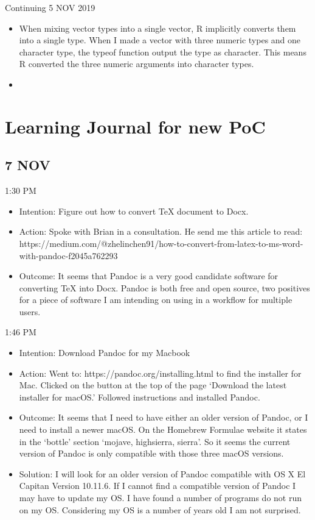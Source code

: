 \documentclass{article}
\begin{document}
Continuing 5 NOV 2019

\begin{itemize}
    \item When mixing vector types into a single vector, R implicitly converts them into a single type. When I made a vector with three numeric types and one character type, the typeof function output the type as character. This means R converted the three numeric arguments into character types.
    \item 
\end{itemize}

\section{Learning Journal for new PoC}

\subsection{7 NOV}

1:30 PM
\begin{itemize}
    \item Intention: Figure out how to convert TeX document to Docx.
    \item Action: Spoke with Brian in a consultation. He send me this article to read: https://medium.com/@zhelin\-chen91/how-to-convert-from-latex-to-ms-word-with-pandoc-f2045a762293
    \item Outcome: It seems that Pandoc is a very good candidate software for converting TeX into Docx. Pandoc is both free and open source, two positives for a piece of software I am intending on using in a workflow for multiple users.
\end{itemize}

1:46 PM
\begin{itemize}
    \item Intention: Download Pandoc for my Macbook
    \item Action: Went to: https://pandoc.org/installing.html to find the installer for Mac. Clicked on the button at the top of the page `Download the latest installer for macOS.' Followed instructions and installed Pandoc. 
    \item Outcome: It seems that I need to have either an older version of Pandoc, or I need to install a newer macOS. On the Homebrew Formulae website it states in the `bottle' section `mojave, high\textunderscore sierra, sierra'. So it seems the current version of Pandoc is only compatible with those three macOS versions.
    \item Solution: I will look for an older version of Pandoc compatible with OS X El Capitan Version 10.11.6. If I cannot find a compatible version of Pandoc I may have to update my OS. I have found a number of programs do not run on my OS. Considering my OS is a number of years old I am not surprised.
\end{itemize}
\end{document}
